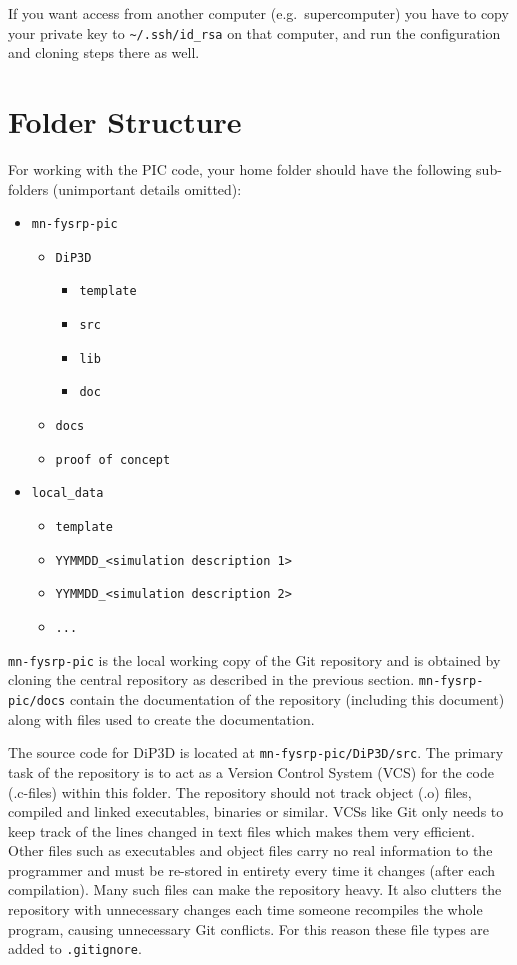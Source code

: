 \documentclass[10pt,a4paper]{article}
\begin{document}
If you want access from another computer (e.g.\ supercomputer) you have to copy your private key to \verb$~/.ssh/id_rsa$ on that computer, and run the configuration and cloning steps there as well. 

\section{Folder Structure}
For working with the PIC code, your home folder should have the following sub-folders (unimportant details omitted):

\begin{itemize}
	\item \verb$mn-fysrp-pic$
	\begin{itemize}
		\item \verb$DiP3D$
		\begin{itemize}
			\item \verb$template$
			\item \verb$src$
			\item \verb$lib$
			\item \verb$doc$
		\end{itemize}
		\item \verb$docs$
		\item \verb$proof of concept$
	\end{itemize}
	\item \verb$local_data$
	\begin{itemize}
		\item \verb$template$
		\item \verb$YYMMDD_<simulation description 1>$
		\item \verb$YYMMDD_<simulation description 2>$
		\item \verb$...$
	\end{itemize}
\end{itemize}

\verb$mn-fysrp-pic$ is the local working copy of the Git repository and is obtained by cloning the central repository as described in the previous section. \verb$mn-fysrp-pic/docs$ contain the documentation of the repository (including this document) along with files used to create the documentation.

The source code for DiP3D is located at \verb$mn-fysrp-pic/DiP3D/src$. The primary task of the repository is to act as a Version Control System (VCS) for the code (.c-files) within this folder. The repository should not track object (.o) files, compiled and linked executables, binaries or similar. VCSs like Git only needs to keep track of the lines changed in text files which makes them very efficient. Other files such as executables and object files carry no real information to the programmer and must be re-stored in entirety every time it changes (after each compilation). Many such files can make the repository heavy. It also clutters the repository with unnecessary changes each time someone recompiles the whole program, causing unnecessary Git conflicts. For this reason these file types are added to \verb$.gitignore$.
\end{document}
